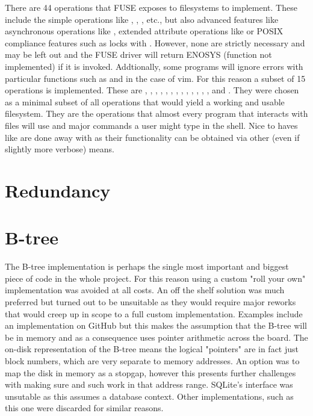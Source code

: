         There are 44 operations that FUSE exposes to filesystems to implement.
        These include the simple operations like ,
        , , etc., but also advanced features like
        asynchronous operations like , extended attribute
        operations like  or POSIX compliance features such as
        locks with . However, none are strictly necessary and
        may be left out and the FUSE driver will return ENOSYS (function not
        implemented) if it is invoked. Addtionally, some programs will ignore
        errors with particular functions such as  and
         in the case of vim. For this reason a subset of 15
        operations is implemented. These are  ,
        , , , ,
        , , , ,
        , , , ,
         and . They were chosen as a minimal
        subset of all operations that would yield a working and usable
        filesystem. They are the operations that almost every program that
        interacts with files will use and major commands a user might type in
        the shell. Nice to haves like  are done away with as
        their functionality can be obtained via other (even if slightly more
        verbose) means.

    \section{Redundancy}

    \section{B-tree}

        The B-tree implementation is perhaps the single most important and
        biggest piece of code in the whole project. For this reason using a
        custom "roll your own" implementation was avoided at all costs. An off
        the shelf solution was much preferred but turned out to be unsuitable
        as they would require major reworks that would creep up in scope to a
        full custom implementation. Examples include an implementation on
        GitHub \cite{https://github.com/tidwall/btree.c} but this makes the
        assumption that the B-tree will be in memory and as a consequence uses
        pointer arithmetic across the board. The on-disk representation of the
        B-tree means the logical "pointers" are in fact just block numbers,
        which are very separate to memory addresses. An option was to map the
        disk in memory as a stopgap, however this presents further challenges
        with making sure  and such work in that address range.
        SQLite's interface \cite{https://sqlite.org/btreemodule.html} was
        unsutable as this assumes a database context. Other implementations,
        such as this one \cite{http://fallabs.com/tokyocabinet/spex-en.html}
        were discarded for similar reasons.


